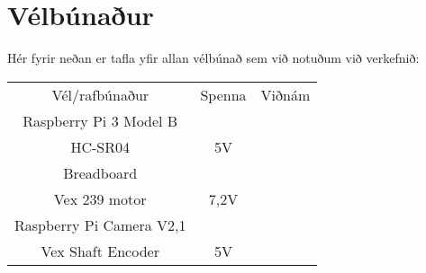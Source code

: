 \section{Vélbúnaður}
Hér fyrir neðan er tafla yfir allan vélbúnað sem við notuðum við verkefnið:

\begin{center}
\begin{tabular}{ |c|c|c| } 
 \hline
 Vél/rafbúnaður &Spenna &Viðnám\\ 
 Raspberry Pi 3 Model B & &\\ 
 HC-SR04 &5V &  \\ 
 Breadboard & & \\
 Vex 239 motor & 7,2V & \\
 Raspberry Pi Camera V2,1 & & \\
 Vex Shaft Encoder & 5V & \\
 \hline
\end{tabular}
\end{center}